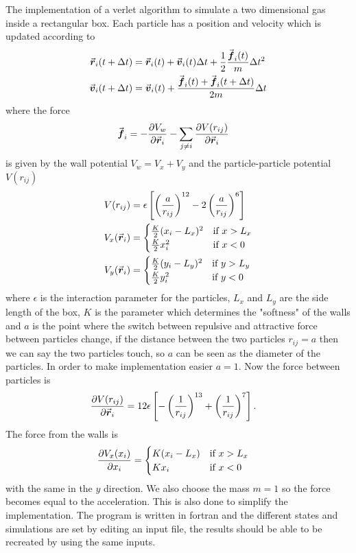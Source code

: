 \documentclass[10pt,a4paper,aps,twocolumn,secnumarabic,numerical,balancelastpage,nofootinbib,superscriptaddress]{revtex4-2}
\begin{document}
		The implementation of a verlet algorithm to simulate a two dimensional gas inside a rectangular box. Each particle has a position and velocity which is updated according to
		\begin{align}
			\va*{r}_i(t+\Delta t)&=\va*{r}_i(t)+\va*{v}_i(t)\Delta t+\frac{1}{2}\frac{\va*{f}_i(t)}{m}\Delta t^2\\
			\va*{v}_i(t+\Delta t)&=\va*{v}_i(t) +\frac{\va*{f}_i(t)+\va*{f}_i(t+\Delta t)}{2m}\Delta t
		\end{align}
		where the force
		\begin{align}
			\va*{f}_i&=-\pdv{V_w}{\va*{r}_i}-\sum_{j\neq i}\pdv{V(r_{ij})}{\va*{r}_i}
		\end{align}
		is given by the wall potential $V_w=V_x+V_y$ and the particle-particle potential $V(r_{ij})$
		\begin{align}
			V(r_{ij})&=\epsilon \left [\left (\frac{a}{r_{ij}}\right )^{12}-2\left (\frac{a}{r_{ij}}\right )^6\right ]\\
			V_x(\va*{r}_i)&=
			\begin{cases}
				\frac{K}{2}(x_i-L_x)^2	&	\text{if }x >L_x\\
				\frac{K}{2}x_i^2	&	\text{if }x < 0
			\end{cases}\\
			V_y(\va*{r}_i)&=
			\begin{cases}
				\frac{K}{2}(y_i-L_y)^2	&	\text{if }y >L_y\\
				\frac{K}{2}y_i^2	&	\text{if }y < 0
			\end{cases}
		\end{align}
		where $\epsilon$ is the interaction parameter for the particles, $L_x$ and $L_y$ are the side length of the box, $K$ is the parameter which determines the "softness" of the walls and $a$ is the point where the switch between repulsive and attractive force between particles change, if the distance between the two particles $r_{ij}=a$ then we can say the two particles touch, so $a$ can be seen as the diameter of the particles. In order to make implementation easier $a=1$. Now the force between particles is
		\begin{align}
			\pdv{V(r_{ij})}{\va*{r}_i}&=12\epsilon\left [-\left (\frac{1}{r_{ij}}\right )^{13}+\left (\frac{1}{r_{ij}}\right )^7\right ].
		\end{align}
		The force from the walls is
		\begin{align}
			\pdv{V_x(x_i)}{x_i}&=
			\begin{cases}
				K(x_i-L_x)	&	\text{if }x > L_x\\
				Kx_i	&	\text{if } x < 0
			\end{cases}
		\end{align}
		with the same in the $y$ direction. We also choose the mass $m=1$ so the force becomes equal to the acceleration. This is also done to simplify the implementation. The program is written in fortran and the different states and simulations are set by editing an input file, the results should be able to be recreated by using the same inputs.
	
\end{document}
